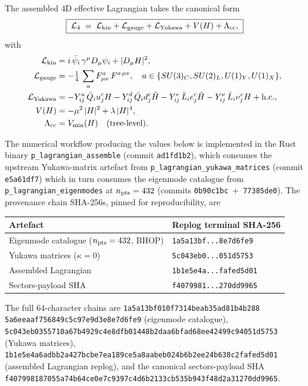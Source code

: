 ﻿\documentclass[reprint,amsmath,amssymb,aps,prd,longbibliography,floatfix]{revtex4-2}
\begin{document}
The assembled 4D effective Lagrangian takes the canonical form
\begin{equation}
\boxed{\;
\mathcal{L}_4 \;=\; \mathcal{L}_{\rm kin}
                 + \mathcal{L}_{\rm gauge}
                 + \mathcal{L}_{\rm Yukawa}
                 + V(H)
                 + \Lambda_{\rm cc},
\;}
\label{eq:lagrangian-canonical}
\end{equation}
with
\begin{align*}
\mathcal{L}_{\rm kin}    &= i\,\bar\psi_i\,\gamma^\mu D_\mu \psi_i + |D_\mu H|^2, \\
\mathcal{L}_{\rm gauge}  &= -\tfrac{1}{4}\,\sum_a F^a_{\mu\nu}\,F^{a\,\mu\nu},
                          \quad a \in \{SU(3)_C, SU(2)_L, U(1)_Y, U(1)_X\}, \\
\mathcal{L}_{\rm Yukawa} &= - Y^u_{ij}\,\bar Q_i u^c_j H
                            - Y^d_{ij}\,\bar Q_i d^c_j \tilde H
                            - Y^e_{ij}\,\bar L_i e^c_j \tilde H
                            - Y^\nu_{ij}\,\bar L_i \nu^c_j H + \mathrm{h.c.}, \\
V(H)                     &= -\mu^2\,|H|^2 + \lambda\,|H|^4, \\
\Lambda_{\rm cc}         &= V_{\min}(H) \quad\text{(tree-level)}.
\end{align*}

The numerical workflow producing the values below is implemented in
the Rust binary \texttt{p\_lagrangian\_assemble} (commit
\texttt{ad1fd1b2}), which consumes the upstream Yukawa-matrix
artefact from \texttt{p\_lagrangian\_yukawa\_matrices}
(commit \texttt{e5a61df7}) which in turn consumes the eigenmode
catalogue from \texttt{p\_lagrangian\_eigenmodes} at $n_{\rm pts}=432$
(commits \texttt{0b90c1bc}~+~\texttt{77385de0}). The provenance chain
SHA-256s, pinned for reproducibility, are
\begin{center}
\begin{tabular}{ll}
\toprule
Artefact & Replog terminal SHA-256 \\
\midrule
Eigenmode catalogue ($n_{\rm pts}=432$, BHOP) &
\texttt{1a5a13bf...8e7d6fe9} \\
Yukawa matrices ($\kappa=0$) &
\texttt{5c043eb0...051d5753} \\
Assembled Lagrangian & \texttt{1b1e5e4a...fafed5d01} \\
Sectors-payload SHA & \texttt{f4079981...270dd9965} \\
\bottomrule
\end{tabular}
\end{center}
The full 64-character chains are \texttt{1a5a13bf010f7314beab35ad81b4b288%
5a6eeaaf756849c5c97e9d3e8e7d6fe9} (eigenmode catalogue),
\texttt{5c043eb0355710a67b4929c4e8dfb01448b2daa6bfad68ee42499c94051d5753}
(Yukawa matrices),
\texttt{1b1e5e4a6adbb2a427bcbe7ea189ce5a8aabeb024b6b2ee24b638c2fafed5d01}
(assembled Lagrangian replog), and the canonical sectors-payload SHA
\texttt{f407998187055a74b64ce0e7c9397c4d6b2133cb535b943f48d2a31270dd9965}.
\end{document}
